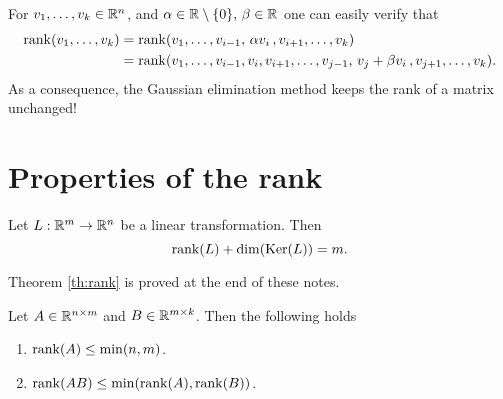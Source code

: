 \documentclass[11pt,nocut]{article}
\begin{document}

\begin{remark}
	For $v_1, \dots, v_k \in \mathbb{R}^n$, and $\alpha \in \mathbb{R} \setminus \{0\}, \, \beta \in \mathbb{R}$ one can easily verify that
	\begin{align*}
	{{\rm rank}}(v_1, \dots, v_k)
	&=
	{{\rm rank}}(v_1, \dots, v_{i-1}, \, \alpha v_i \, , v_{i+1}, \dots, v_k)\\
	&=
	{{\rm rank}}(v_1, \dots, v_{i-1}, v_i, v_{i+1}, \dots, v_{j-1}, \, v_j + \beta v_i \, , v_{j+1}, \dots, v_k).
	\end{align*}
	As a consequence, the Gaussian elimination method keeps the rank of a matrix unchanged!
\end{remark}

\section{Properties of the rank}



\begin{theorem}\label{th:rank}
	Let $L: \mathbb{R}^m \to \mathbb{R}^n$ be a linear transformation. Then
	$$
	{{\rm rank}}(L) + {{\rm dim}}({{\rm Ker}}(L)) = m.
	$$
\end{theorem}
Theorem \ref{th:rank} is proved at the end of these notes.

\begin{proposition}
	Let $A \in \mathbb{R}^{n \times m}$ and $B \in \mathbb{R}^{m \times k}$. Then the following holds
	\begin{enumerate}[label=(\roman*)]
		\item ${{\rm rank}}(A) \leq \min(n,m)$.
		\item ${{\rm rank}}(AB) \leq \min({{\rm rank}}(A),{{\rm rank}}(B))$.
	\end{enumerate}
\end{proposition}
\end{document}
